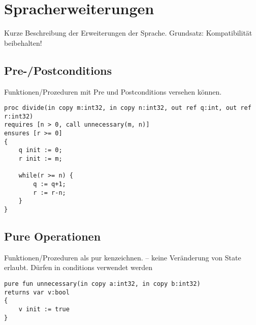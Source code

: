 \section{Spracherweiterungen}

Kurze Beschreibung der Erweiterungen der Sprache. Grundsatz: Kompatibilität beibehalten!

\subsection{Pre-/Postconditions}
Funktionen/Prozeduren mit Pre und Postconditions versehen können.


\begin{lstlisting}[caption=Definieren von pre-/postconditions]
proc divide(in copy m:int32, in copy n:int32, out ref q:int, out ref r:int32)
requires [n > 0, call unnecessary(m, n)]
ensures [r >= 0]
{
    q init := 0;
    r init := m;

    while(r >= n) {
        q := q+1;
        r := r-n;
    }
}
\end{lstlisting}



\subsection{Pure Operationen}
Funktionen/Prozeduren als pur kenzeichnen. -- keine Veränderung von State erlaubt. Dürfen in conditions verwendet werden
\begin{lstlisting}[caption=Pure Operationen]
pure fun unnecessary(in copy a:int32, in copy b:int32)
returns var v:bool 
{
    v init := true
}
\end{lstlisting}




